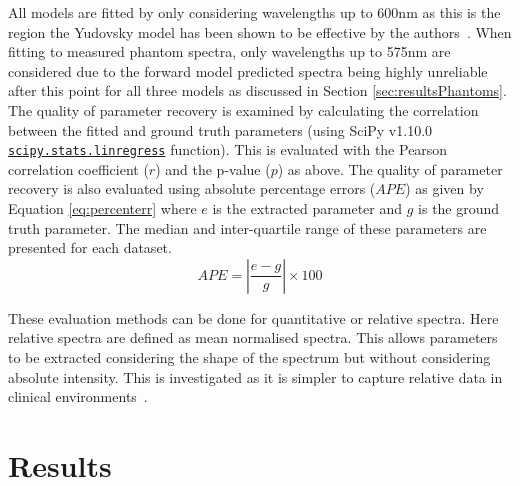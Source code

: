 All models are fitted by only considering wavelengths up to 600nm as this is the region the Yudovsky model has been shown to be effective by the authors~\citep{Yudovsky2011a}.
When fitting to measured phantom spectra, only wavelengths up to 575nm are considered due to the forward model predicted spectra being highly unreliable after this point for all three models as discussed in Section \ref{sec:resultsPhantoms}. The quality of parameter recovery is examined by calculating the correlation between the fitted and ground truth parameters (using SciPy v1.10.0 \href{https://docs.scipy.org/doc/scipy/reference/generated/scipy.stats.linregress.html}{\texttt{scipy.stats.linregress}} function). This is evaluated with the Pearson correlation coefficient ($r$) and the p-value ($p$) as above. The quality of parameter recovery is also evaluated using absolute percentage errors ($APE$) as given by Equation \eqref{eq:percenterr} where $e$ is the extracted parameter and $g$ is the ground truth parameter. The median and inter-quartile range of these parameters are presented for each dataset. 
\begin{equation}
    APE = |\frac{e - g}{g}| \times 100 
    \label{eq:percenterr}
\end{equation}

These evaluation methods can be done for quantitative or relative spectra. Here relative spectra are defined as mean normalised spectra. This allows parameters to be extracted considering the shape of the spectrum but without considering absolute intensity. This is investigated as it is simpler to capture relative data in clinical environments~\citep{Bahl2023}.

\section{Results}\label{sec:results}
